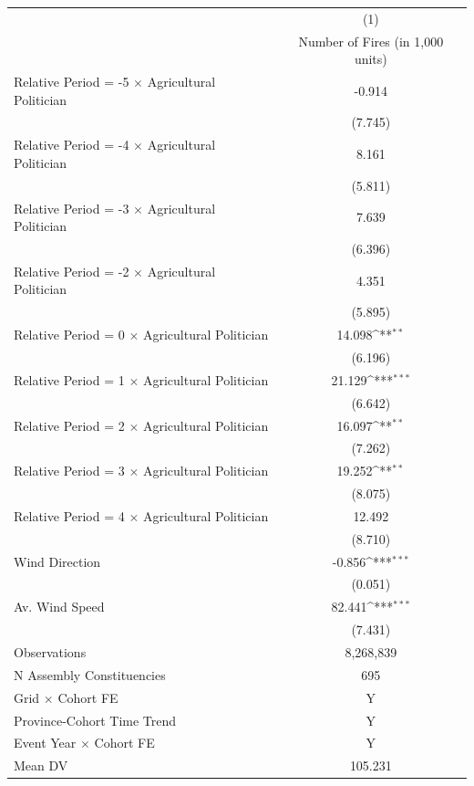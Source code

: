 {
\def\sym#1{\ifmmode^{#1}\else\(^{#1}\)\fi}
\begin{tabular}{l*{1}{c}}
\hline
            & \multicolumn{1}{c}{(1)}             \\
            & \multicolumn{1}{c}{Number of Fires (in 1,000 units)} \\ \hline

Relative Period = -5 $\times$ Agricultural Politician&      -0.914         \\
            &     (7.745)         \\
Relative Period = -4 $\times$ Agricultural Politician&       8.161         \\
            &     (5.811)         \\
Relative Period = -3 $\times$ Agricultural Politician&       7.639         \\
            &     (6.396)         \\
Relative Period = -2 $\times$ Agricultural Politician&       4.351         \\
            &     (5.895)         \\
Relative Period = 0 $\times$ Agricultural Politician&      14.098\sym{**} \\
            &     (6.196)         \\
Relative Period = 1 $\times$ Agricultural Politician&      21.129\sym{***}\\
            &     (6.642)         \\
Relative Period = 2 $\times$ Agricultural Politician&      16.097\sym{**} \\
            &     (7.262)         \\
Relative Period = 3 $\times$ Agricultural Politician&      19.252\sym{**} \\
            &     (8.075)         \\
Relative Period = 4 $\times$ Agricultural Politician&      12.492         \\
            &     (8.710)         \\
Wind Direction&      -0.856\sym{***}\\
            &     (0.051)         \\
Av. Wind Speed&      82.441\sym{***}\\
            &     (7.431)         \\
\hline
Observations&   8,268,839         \\
N Assembly Constituencies&         695         \\
Grid $\times$ Cohort FE&           Y         \\
Province-Cohort Time Trend&           Y         \\
Event Year $\times$ Cohort FE&           Y         \\
Mean DV     &     105.231         \\
\hline
\end{tabular}
}
